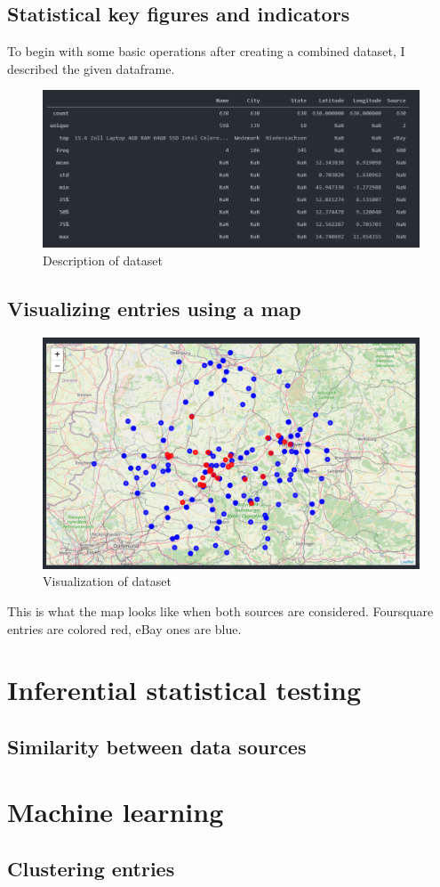 \subsection{Statistical key figures and indicators}
To begin with some basic operations after creating a combined dataset, I described the given dataframe.
\begin{figure}[H]
	\includegraphics[width=\textwidth]{Bilder/general_findings.PNG}
	\caption{Description of dataset}
\end{figure}
\subsection{Visualizing entries using a map}
\begin{figure}[H]
	\includegraphics[width=\textwidth]{Bilder/combined_map.PNG}
	\caption{Visualization of dataset}
\end{figure}
This is what the map looks like when both sources are considered. Foursquare entries are colored red, eBay ones are blue.
\section{Inferential statistical testing}
\subsection{Similarity between data sources}
\section{Machine learning}
\subsection{Clustering entries}